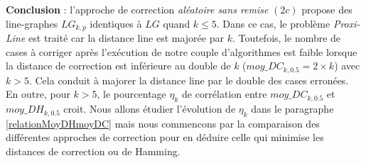 {\bf Conclusion} : l'approche de correction {\em al\'eatoire sans remise} $(2c)$ propose des line-graphes $LG_{k,p}$  identiques \`a $LG$ quand $k \le 5$. Dans ce cas, le probl\`eme {\em Proxi-Line} est trait\'e car la distance line est major\'ee par $k$. 
Toutefois, le nombre de cases \`a corriger apr\`es l'ex\'ecution de notre couple d'algorithmes est faible lorsque la distance de correction est inf\'erieure au double de $k$ ($moy\_DC_{k,0.5} = 2 \times k$) avec $k>5$. Cela conduit \`a majorer la distance line par le double des cases erron\'ees.
En outre, pour $k>5$, le pourcentage  $\eta_k$ de corr\'elation entre $moy\_DC_{k,0.5}$ et $moy\_DH_{k,0.5}$ croit. Nous allons \'etudier l'\'evolution de $\eta_k$  dans le paragraphe \ref{relationMoyDHmoyDC} mais nous commencons par la comparaison des diff\'erentes approches de correction pour en d\'eduire celle qui minimise les distances de correction ou de Hamming.

